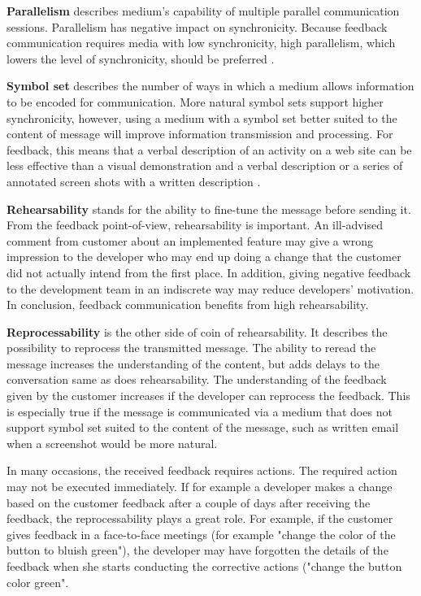 \documentclass[english,12pt,a4paper,pdftex]{article}
\begin{document}
\textbf{Parallelism} describes medium's capability of multiple parallel communication sessions. Parallelism has negative impact on synchronicity. Because feedback communication requires media with low synchronicity, high parallelism, which lowers the level of synchronicity, should be preferred \citep{dennis1999}.

\textbf{Symbol set} describes the number of ways in which a medium allows information to be encoded for communication. More natural symbol sets support higher synchronicity, however, using a medium with a symbol set better suited to the content of message will improve information transmission and processing. For feedback, this means that a verbal description of an activity on a web site can be less effective than a visual demonstration and a verbal description or a series of annotated screen shots with a written description \citep{dennis1999}.

\textbf{Rehearsability} stands for the ability to fine-tune the message before sending it. From the feedback point-of-view, rehearsability is important. An ill-advised comment from customer about an implemented feature may give a wrong impression to the developer who may end up doing a change that the customer did not actually intend from the first place. In addition, giving negative feedback to the development team in an indiscrete way may reduce developers' motivation. In conclusion, feedback communication benefits from high rehearsability.

\textbf{Reprocessability} is the other side of coin of rehearsability. It describes the possibility to reprocess the transmitted message. The ability to reread the message increases the understanding of the content, but adds delays to the conversation same as does rehearsability. The understanding of the feedback given by the customer increases if the developer can reprocess the feedback. This is especially true if the message is communicated via a medium that does not support symbol set suited to the content of the message, such as written email when a screenshot would be more natural.

In many occasions, the received feedback requires actions. The required action may not be executed immediately. If for example a developer makes a change based on the customer feedback after a couple of days after receiving the feedback, the reprocessability plays a great role. For example, if the customer gives feedback in a face-to-face meetings (for example "change the color of the button to bluish green"), the developer may have forgotten the details of the feedback when she starts conducting the corrective actions ("change the button color green".
\end{document}
